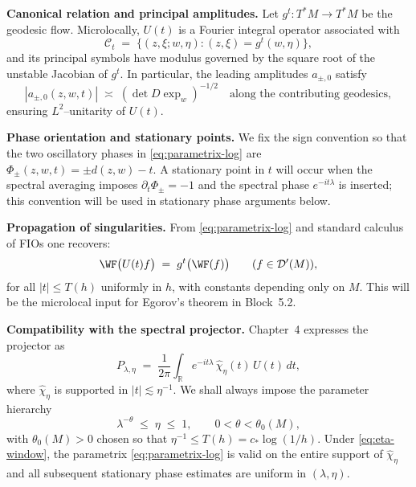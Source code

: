 \medskip

\noindent\textbf{Canonical relation and principal amplitudes.}
Let $g^{t}:T^{*}M\to T^{*}M$ be the geodesic flow.
Microlocally, $U(t)$ is a Fourier integral operator associated with
\[
\mathcal{C}_{t}\;=\;\{(z,\xi;w,\eta): (z,\xi)=g^{t}(w,\eta)\},
\]
and its principal symbols have modulus governed by the square root of the unstable Jacobian
of $g^{t}$.
In particular, the leading amplitudes $a_{\pm,0}$ satisfy
\[
|a_{\pm,0}(z,w,t)|\;\asymp\;(\det D\exp_{w})^{-1/2}\quad\text{along the contributing geodesics},
\]
ensuring $L^{2}$–unitarity of $U(t)$.

\medskip

\noindent\textbf{Phase orientation and stationary points.}
We fix the sign convention so that the two oscillatory phases in
\eqref{eq:parametrix-log} are $\Phi_{\pm}(z,w,t)=\pm d(z,w)-t$.
A stationary point in $t$ will occur when the spectral averaging imposes
$\partial_{t}\Phi_{\pm}=-1$ and the spectral phase $e^{-it\lambda}$ is inserted;
this convention will be used in stationary phase arguments below.

\medskip

\noindent\textbf{Propagation of singularities.}
From \eqref{eq:parametrix-log} and standard calculus of FIOs one recovers:
\begin{equation}\label{eq:WF-propagation}
\WF\big(U(t)f\big)\;=\;g^{t}\big(\WF(f)\big)\qquad (f\in\mathcal{D}'(M)),
\end{equation}
for all $|t|\le T(h)$ uniformly in $h$, with constants depending only on $M$.
This will be the microlocal input for Egorov’s theorem in Block~5.2.

\medskip

\noindent\textbf{Compatibility with the spectral projector.}
Chapter~4 expresses the projector as
\[
P_{\lambda,\eta}\;=\;\frac{1}{2\pi}\int_{\mathbb{R}}e^{-it\lambda}\,\widehat{\chi}_{\eta}(t)\,U(t)\,dt,
\]
where $\widehat{\chi}_{\eta}$ is supported in $|t|\lesssim \eta^{-1}$.
We shall always impose the parameter hierarchy
\begin{equation}\label{eq:eta-window}
\lambda^{-\theta}\;\le\;\eta\;\le\;1,\qquad 0<\theta<\theta_{0}(M),
\end{equation}
with $\theta_{0}(M)>0$ chosen so that $\eta^{-1}\le T(h)=c_{*}\log(1/h)$.
Under \eqref{eq:eta-window}, the parametrix \eqref{eq:parametrix-log} is valid on the entire
support of $\widehat{\chi}_{\eta}$ and all subsequent stationary phase estimates
are uniform in $(\lambda,\eta)$.

